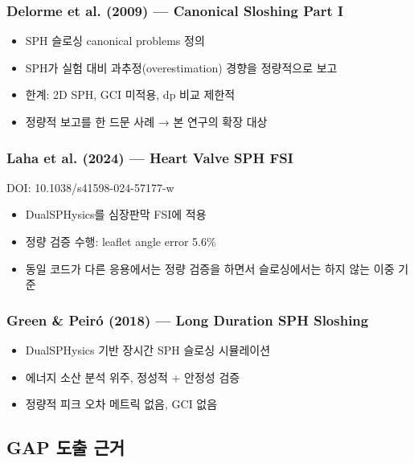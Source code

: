 \documentclass[a4paper,11pt]{article}
\begin{document}
\subsubsection{Delorme et al. (2009) --- Canonical Sloshing Part I}

\begin{itemize}
    \item SPH 슬로싱 canonical problems 정의
    \item SPH가 실험 대비 과추정(overestimation) 경향을 정량적으로 보고
    \item 한계: 2D SPH, GCI 미적용, dp 비교 제한적
    \item 정량적 보고를 한 드문 사례 → 본 연구의 확장 대상
\end{itemize}

\subsubsection{Laha et al. (2024) --- Heart Valve SPH FSI}

DOI: 10.1038/s41598-024-57177-w

\begin{itemize}
    \item DualSPHysics를 심장판막 FSI에 적용
    \item 정량 검증 수행: leaflet angle error 5.6\%
    \item 동일 코드가 다른 응용에서는 정량 검증을 하면서 슬로싱에서는 하지 않는 이중 기준
\end{itemize}

\subsubsection{Green \& Peir\'o (2018) --- Long Duration SPH Sloshing}

\begin{itemize}
    \item DualSPHysics 기반 장시간 SPH 슬로싱 시뮬레이션
    \item 에너지 소산 분석 위주, 정성적 + 안정성 검증
    \item 정량적 피크 오차 메트릭 없음, GCI 없음
\end{itemize}


\subsection{GAP 도출 근거}
\end{document}
